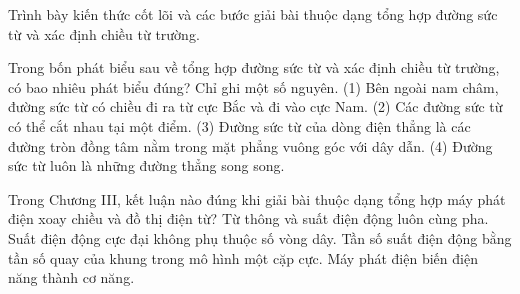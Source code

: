 \begin{bt}
Trình bày kiến thức cốt lõi và các bước giải bài thuộc dạng tổng hợp đường sức từ và xác định chiều từ trường.
\end{bt}

\begin{ex}
Trong bốn phát biểu sau về tổng hợp đường sức từ và xác định chiều từ trường, có bao nhiêu phát biểu đúng? Chỉ ghi một số nguyên. (1) Bên ngoài nam châm, đường sức từ có chiều đi ra từ cực Bắc và đi vào cực Nam. (2) Các đường sức từ có thể cắt nhau tại một điểm. (3) Đường sức từ của dòng điện thẳng là các đường tròn đồng tâm nằm trong mặt phẳng vuông góc với dây dẫn. (4) Đường sức từ luôn là những đường thẳng song song.
\end{ex}

\begin{ex}
Trong Chương III, kết luận nào đúng khi giải bài thuộc dạng tổng hợp máy phát điện xoay chiều và đồ thị điện từ?
\choice
{Từ thông và suất điện động luôn cùng pha.}
{Suất điện động cực đại không phụ thuộc số vòng dây.}
{\True Tần số suất điện động bằng tần số quay của khung trong mô hình một cặp cực.}
{Máy phát điện biến điện năng thành cơ năng.}
\end{ex}

